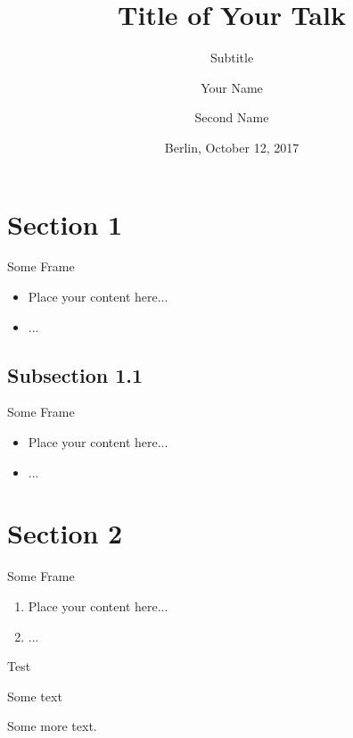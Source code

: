 \documentclass[12pt
	usepdftitle=false,
	hyperref={
		pdfauthor={Your Name},
		pdftitle={Title of Your Talk},
		pdfsubject={Talk},
		pdfcreator={LaTeX},
	}
]{beamer}
\title[Short Title]{Title of Your Talk}
\subtitle{Subtitle}
\author[Name1 \and Name2]{Your Name \and Second Name}
\institute[Short Affiliation]{Your Affiliation}%
\date[Berlin, October 12, 2017]{Berlin, October 12, 2017}
\begin{document}
\maketitle
{}

\section{Section 1}
\begin{frame}{Some Frame}
  \begin{itemize}
    \item Place your content here...
    \item ...
  \end{itemize}
\end{frame}

\subsection{Subsection 1.1}
\begin{frame}{Some Frame}
  \begin{itemize}
    \item Place your content here...
    \item ...
  \end{itemize}
\end{frame}

\section{Section 2}
\begin{frame}{Some Frame}
  \begin{enumerate}
    \item Place your content here...
    \item ...
   \end{enumerate}
\end{frame}


\begin{frame}{Test}
 \begin{example}[Example1]
    Some text
 \end{example}
\begin{theorem}
 Some more text.
\end{theorem}
\end{frame}
\end{document}
